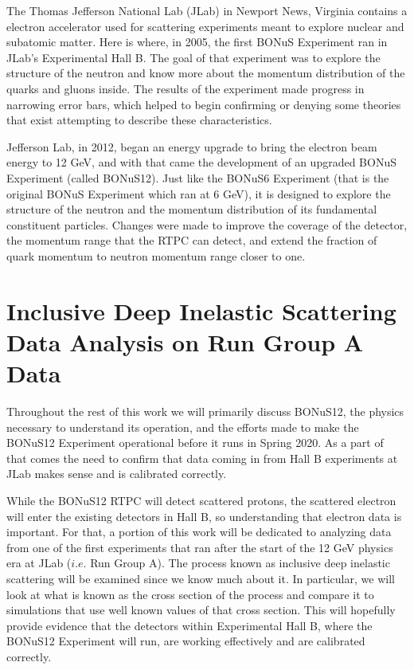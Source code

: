  The Thomas Jefferson National Lab (JLab) in Newport News, Virginia contains a electron accelerator used for scattering experiments meant to explore nuclear and subatomic matter. Here is where, in 2005, the first BONuS Experiment ran in JLab's Experimental Hall B. The goal of that experiment was to explore the structure of the neutron and know more about the momentum distribution of the quarks and gluons inside. The results of the experiment made progress in narrowing error bars, which helped to begin confirming or denying some theories that exist attempting to describe these characteristics.
 
 Jefferson Lab, in 2012, began an energy upgrade to bring the electron beam energy to 12 GeV, and with that came the development of an upgraded BONuS Experiment (called BONuS12). Just like the BONuS6 Experiment (that is the original BONuS Experiment which ran at 6 GeV), it is designed to explore the structure of the neutron and the momentum distribution of its fundamental constituent particles. Changes were made to improve the coverage of the detector, the momentum range that the RTPC can detect, and extend the fraction of quark momentum to neutron momentum  range closer to one.
 
\section{Inclusive Deep Inelastic Scattering Data Analysis on Run Group A Data}
Throughout the rest of this work we will primarily discuss BONuS12, the physics necessary to understand its operation, and the efforts made to make the BONuS12 Experiment operational before it runs in Spring 2020. As a part of that comes the need to confirm that data coming in from Hall B experiments at JLab makes sense and is calibrated correctly. 

While the BONuS12 RTPC will detect scattered protons, the scattered electron will enter the existing detectors in Hall B, so understanding that electron data is important. For that, a portion of this work will be dedicated to analyzing data from one of the first experiments that ran after the start of the 12 GeV physics era at JLab ($i.e.$ Run Group A). The process known as inclusive deep inelastic scattering will be examined since we know much about it. In particular, we will look at what is known as the cross section of the process and compare it to simulations that use well known values of that cross section. This will hopefully provide evidence that the detectors within Experimental Hall B, where the BONuS12 Experiment will run, are working effectively and are calibrated correctly.